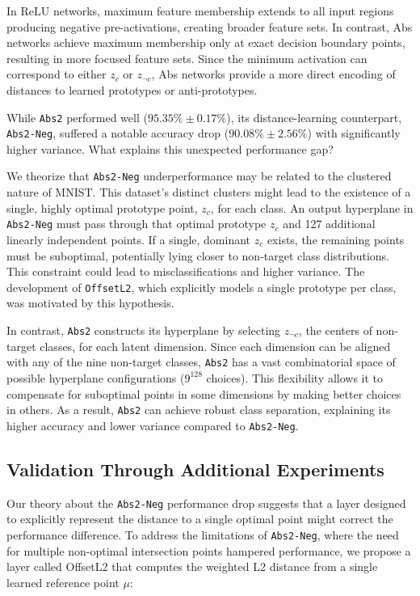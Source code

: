 In ReLU networks, maximum feature membership extends to all input regions producing negative pre-activations, creating broader feature sets. In contrast, Abs networks achieve maximum membership only at exact decision boundary points, resulting in more focused feature sets. Since the minimum activation can correspond to either $z_c$ or $z_{\neg c}$, Abs networks provide a more direct encoding of distances to learned prototypes or anti-prototypes.

While \texttt{Abs2} performed well ($95.35\% \pm 0.17\%$), its distance-learning counterpart, \texttt{Abs2-Neg}, suffered a notable accuracy drop ($90.08\% \pm 2.56\%$) with significantly higher variance. What explains this unexpected performance gap?

We theorize that \texttt{Abs2-Neg} underperformance may be related to the clustered nature of MNIST. This dataset's distinct clusters might lead to the existence of a single, highly optimal prototype point, $z_c$, for each class. An output hyperplane in \texttt{Abs2-Neg} must pass through that optimal prototype $z_c$ and 127 additional linearly independent points. If a single, dominant $z_c$ exists, the remaining points must be suboptimal, potentially lying closer to non-target class distributions. This constraint could lead to misclassifications and higher variance. The development of \texttt{OffsetL2}, which explicitly models a single prototype per class, was motivated by this hypothesis.

In contrast, \texttt{Abs2} constructs its hyperplane by selecting $z_{\neg c}$, the centers of non-target classes, for each latent dimension. Since each dimension can be aligned with any of the nine non-target classes, \texttt{Abs2} has a vast combinatorial space of possible hyperplane configurations ($9^{128}$ choices). This flexibility allows it to compensate for suboptimal points in some dimensions by making better choices in others. As a result, \texttt{Abs2} can achieve robust class separation, explaining its higher accuracy and lower variance compared to \texttt{Abs2-Neg}.

\subsection{Validation Through Additional Experiments}

Our theory about the \texttt{Abs2-Neg} performance drop suggests that a layer designed to explicitly represent the distance to a single optimal point might correct the performance difference. To address the limitations of \texttt{Abs2-Neg}, where the need for multiple non-optimal intersection points hampered performance, we propose a layer called OffsetL2 that computes the weighted L2 distance from a single learned reference point $\mu$:

